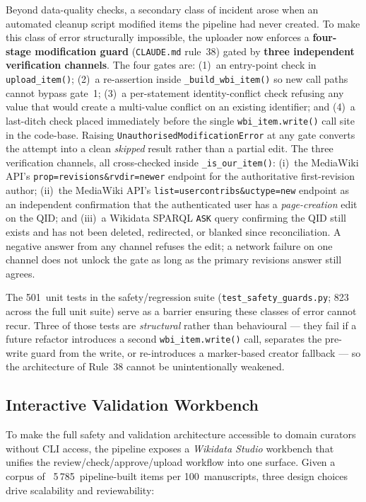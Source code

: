 \documentclass[Afour,sageh,times]{sagej}
\newcommand{\code}[1]{\texttt{#1}}
\begin{document}
Beyond data-quality checks, a secondary class of incident arose when an automated cleanup script modified items the pipeline had never created. To make this class of error structurally impossible, the uploader now enforces a \textbf{four-stage modification guard} (\texttt{CLAUDE.md} rule~38) gated by \textbf{three independent verification channels}. The four gates are: (1)~an entry-point check in \code{upload\_item()}; (2)~a re-assertion inside \code{\_build\_wbi\_item()} so new call paths cannot bypass gate~1; (3)~a per-statement identity-conflict check refusing any value that would create a multi-value conflict on an existing identifier; and (4)~a last-ditch check placed immediately before the single \code{wbi\_item.write()} call site in the code-base. Raising \code{UnauthorisedModificationError} at any gate converts the attempt into a clean \emph{skipped} result rather than a partial edit. The three verification channels, all cross-checked inside \code{\_is\_our\_item()}: (i)~the MediaWiki API's \code{prop=revisions\&rvdir=newer} endpoint for the authoritative first-revision author; (ii)~the MediaWiki API's \code{list=usercontribs\&uctype=new} endpoint as an independent confirmation that the authenticated user has a \emph{page-creation} edit on the QID; and (iii)~a Wikidata SPARQL \code{ASK} query confirming the QID still exists and has not been deleted, redirected, or blanked since reconciliation. A negative answer from any channel refuses the edit; a network failure on one channel does not unlock the gate as long as the primary revisions answer still agrees.

The 501~unit tests in the safety/regression suite (\texttt{test\_safety\_guards.py}; 823 across the full unit suite) serve as a barrier ensuring these classes of error cannot recur. Three of those tests are \emph{structural} rather than behavioural --- they fail if a future refactor introduces a second \code{wbi\_item.write()} call, separates the pre-write guard from the write, or re-introduces a marker-based creator fallback --- so the architecture of Rule~38 cannot be unintentionally weakened.

\subsection{Interactive Validation Workbench}

To make the full safety and validation architecture accessible to domain curators without CLI access, the pipeline exposes a \emph{Wikidata Studio} workbench that unifies the review/check/approve/upload workflow into one surface. Given a corpus of ~5\,785~pipeline-built items per 100~manuscripts, three design choices drive scalability and reviewability:
\end{document}
